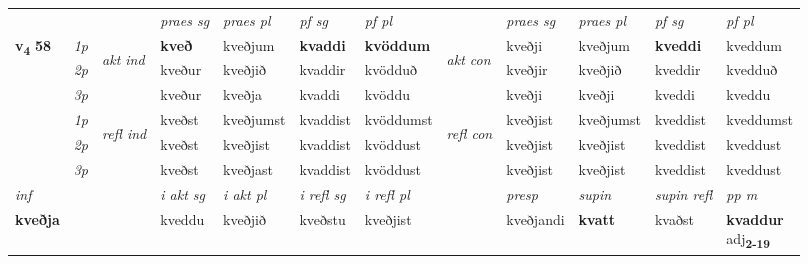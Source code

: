 \begin{longtable}[l]{X>{\footnotesize\itshape}llXXXXlXXXX}
\midrule

 & &   & \textit{praes sg}  & \textit{praes pl}    & \textit{ pf sg} & \textit{pf pl} & & \textit{praes sg}  & \textit{praes pl}    & \textit{pf sg} & \textit{pf pl }  \\ \cmidrule{4-7} \cmidrule{9-12}
 \multirow{2}{*}{{{\textbf{v{\textsubscript{4}}} \Large{\textbf{58}}}}}  & 1p & \multirow{3}{*}{\begin{turn}{90}\textit{akt ind}\end{turn}} & \textbf{kveð} & kveðjum & \textbf{kvaddi} & \textbf{kvöddum} & \multirow{3}{*}{\begin{turn}{90}\textit{akt con}\end{turn}} &kveðji & kveðjum & \textbf{kveddi} & kveddum\\*
 & 2p &  &  kveður  & kveðjið & kvaddir & kvödduð & & kveðjir & kveðjið & kveddir & kvedduð \\*
 & 3p &  & kveður & kveðja & kvaddi & kvöddu & & kveðji & kveðji& kveddi & kveddu \\*
\cmidrule{4-7} \cmidrule{9-12}
 & 1p & \multirow{3}{*}{\begin{turn}{90}\textit{refl ind}\end{turn}}  & kveðst & kveðjumst & kvaddist & kvöddumst & \multirow{3}{*}{\begin{turn}{90}\textit{refl con}\end{turn}}  &kveðjist & kveðjumst & kveddist & kveddumst \\*
 & 2p &  & kveðst & kveðjist & kvaddist & kvöddust & &kveðjist & kveðjist & kveddist & kveddust \\*
 & 3p  & & kveðst & kveðjast & kvaddist & kvöddust & & kveðjist & kveðjist& kveddist & kveddust \\*
\cmidrule{4-7} \cmidrule{9-12}

   {\textit{inf}} & &  & \textit{i akt sg} & \textit{i akt pl} & \textit{i refl sg} & \textit{i refl pl} && \textit{presp} & \textit{supin} & \textit{supin refl} & \textit{pp m} \\*
  {\textbf{kveðja}} & && kveddu  & kveðjið & kveðstu & kveðjist && kveðjandi &  \textbf{kvatt} & kvaðst & \specialcell{\textbf{kvaddur} \\ adj\textbf{\textsubscript{2-19}}} \\*

\midrule


\end{longtable}
